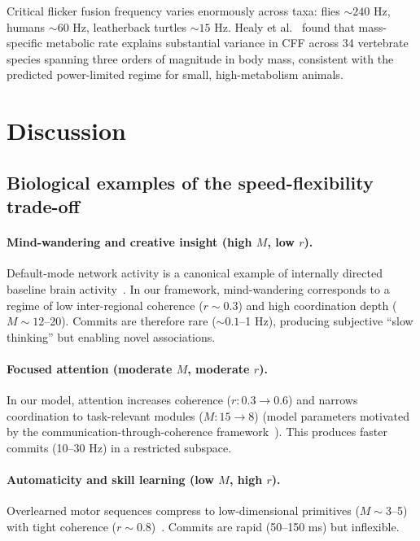 \documentclass[12pt]{article}
\begin{document}
Critical flicker fusion frequency varies enormously across taxa: flies $\sim 240$ Hz, humans $\sim 60$ Hz, leatherback turtles $\sim 15$ Hz. Healy et al.~\cite{healy2013} found that mass-specific metabolic rate explains substantial variance in CFF across 34 vertebrate species spanning three orders of magnitude in body mass, consistent with the predicted power-limited regime for small, high-metabolism animals.

\section{Discussion}

\subsection{Biological examples of the speed-flexibility trade-off}

\paragraph{Mind-wandering and creative insight (high $M$, low $r$).}
Default-mode network activity is a canonical example of internally directed baseline brain activity~\cite{raichle2001}. In our framework, mind-wandering corresponds to a regime of low inter-regional coherence ($r \sim 0.3$) and high coordination depth ($M \sim 12$--20). Commits are therefore rare ($\sim 0.1$--1 Hz), producing subjective ``slow thinking'' but enabling novel associations.

\paragraph{Focused attention (moderate $M$, moderate $r$).}
In our model, attention increases coherence ($r: 0.3 \to 0.6$) and narrows coordination to task-relevant modules ($M: 15 \to 8$) (model parameters motivated by the communication-through-coherence framework~\cite{fries2015}). This produces faster commits (10--30 Hz) in a restricted subspace.

\paragraph{Automaticity and skill learning (low $M$, high $r$).}
Overlearned motor sequences compress to low-dimensional primitives ($M \sim 3$--5) with tight coherence ($r \sim 0.8$)~\cite{wolpert1998}. Commits are rapid (50--150 ms) but inflexible.
\end{document}
